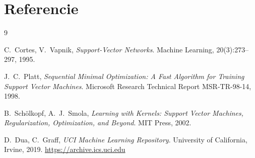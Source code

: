 \documentclass[12pt,a4paper]{article}
\begin{document}
\section*{Referencie}

\begin{thebibliography}{9}

  C.~Cortes, V.~Vapnik,
  \textit{Support-Vector Networks}.
  Machine Learning, 20(3):273--297, 1995.

  J.~C.~Platt,
  \textit{Sequential Minimal Optimization: A Fast Algorithm for Training
  Support Vector Machines}.
  Microsoft Research Technical Report MSR-TR-98-14, 1998.

  B.~Schölkopf, A.~J.~Smola,
  \textit{Learning with Kernels: Support Vector Machines, Regularization,
  Optimization, and Beyond}.
  MIT Press, 2002.

  D.~Dua, C.~Graff,
  \textit{UCI Machine Learning Repository}.
  University of California, Irvine, 2019.
  \url{https://archive.ics.uci.edu}

\end{thebibliography}
\end{document}
